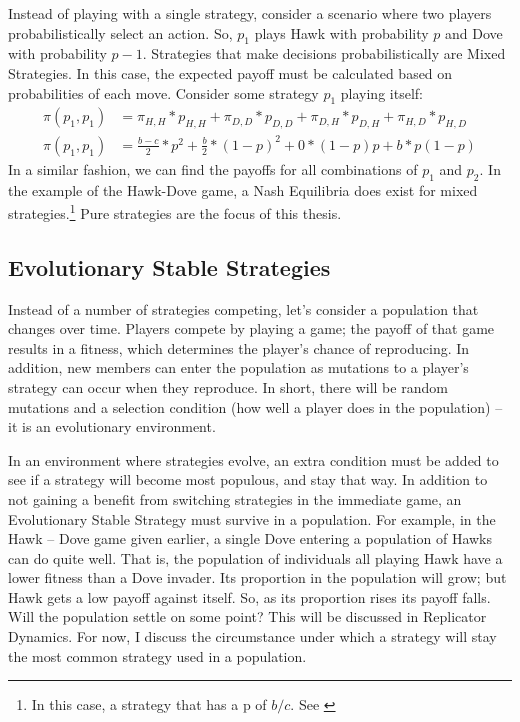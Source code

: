 \documentclass[a4paper,11pt,bcshonoursthesis,singlespace,oneside,thesisdraft,pdflatex]{cssethesis}
\begin{document}
Instead of playing with a single strategy, consider a scenario where two players probabilistically select an action. So, $p_1$ plays Hawk with probability $p$ and Dove with probability $p-1$. Strategies that make decisions probabilistically are Mixed Strategies. 
In this case, the expected payoff must be calculated based on probabilities of each move. 
Consider some strategy $p_1$ playing itself: 
\begin{align}
\label{eqn:probabilities}
\pi(p_1,p_1)&=\pi_{H,H}*p_{H,H}+\pi_{D,D}*p_{D,D}+\pi_{D,H}*p_{D,H}+\pi_{H,D}*p_{H,D}\\
\pi(p_1,p_1)&=\frac{b-c}{2}*p^2+\frac{b}{2}*(1-p)^2+0*(1-p)p+b*p(1-p) \nonumber
\end{align}
In a similar fashion, we can find the payoffs for all combinations of $p_1$ and $p_2$. 
In the example of the Hawk-Dove game, a Nash Equilibria does exist for mixed strategies.\footnote{In this case, a strategy that has a p of $b/c$. See \citet[][p 63]{nowak2006evolutionary63}} Pure strategies are the focus of this thesis.

\subsection{Evolutionary Stable Strategies}
Instead of a number of strategies competing, let's consider a population that changes over time. 
Players compete by playing a game; 
the payoff of that game results in a fitness, which determines the player's chance of reproducing. 
In addition, new members can enter the population as mutations to a player's strategy can occur when they reproduce. 
In short, there will be random mutations and a selection condition (how well a player does in the population) -- it is an evolutionary environment. 

In an environment where strategies evolve, an extra condition must be added to see if a strategy will become most populous, and stay that way. 
In addition to not gaining a benefit from switching strategies in the immediate game, an Evolutionary Stable Strategy must survive in a population. 
For example, in the Hawk -- Dove game given earlier, a single Dove entering a population of Hawks can do quite well. 
That is, the population of individuals all playing Hawk have a lower fitness than a Dove invader. 
Its proportion in the population will grow; but Hawk gets a low payoff against itself. 
So, as its proportion rises its payoff falls. 
Will the population settle on some point? This will be discussed in Replicator Dynamics. 
For now, I discuss the circumstance under which a strategy will stay the most common strategy used in a population. 
\end{document}

